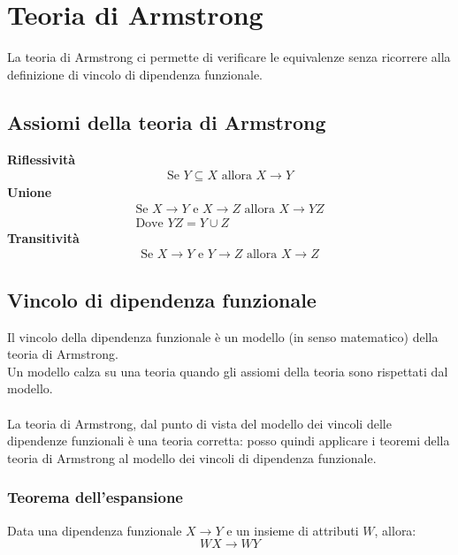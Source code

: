 \section{Teoria di Armstrong}
La teoria di Armstrong ci permette di verificare le equivalenze senza ricorrere alla definizione di vincolo di dipendenza funzionale.

\subsection{Assiomi della teoria di Armstrong}
\textbf{Riflessività}
    \begin{equation}\begin{aligned}
        \text{Se } Y \subseteq X \text{ allora } X \rightarrow Y
    \end{aligned}\end{equation}
\textbf{Unione}
    \begin{equation}\begin{aligned}
        \text{Se } 
            X \rightarrow Y 
            \text{ e } X \rightarrow Z 
            \text{ allora } X \rightarrow YZ\\
        \text{Dove }  YZ = Y \cup Z
    \end{aligned}\end{equation}
\textbf{Transitività}
    \begin{equation}\begin{aligned}
        \text{Se } 
            X \rightarrow Y 
            \text{ e } Y \rightarrow Z 
            \text{ allora } X \rightarrow Z
    \end{aligned}\end{equation}
    
\subsection{Vincolo di dipendenza funzionale}
Il vincolo della dipendenza funzionale è un modello (in senso matematico) della teoria di Armstrong.\\
Un modello calza su una teoria quando gli assiomi della teoria sono rispettati dal modello.\\\\
La teoria di Armstrong, dal punto di vista del modello dei vincoli delle dipendenze funzionali è una teoria corretta: posso quindi applicare i teoremi della teoria di Armstrong al modello dei vincoli di dipendenza funzionale.

\subsubsection{Teorema dell'espansione}
Data una dipendenza funzionale $X \rightarrow Y$ e un insieme di attributi $W$, allora:
    $$WX \rightarrow WY$$

